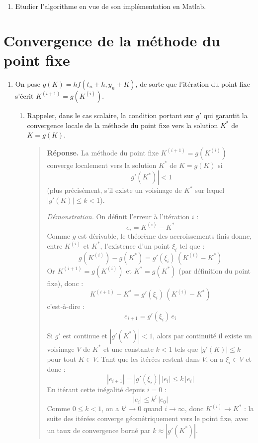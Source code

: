 \documentclass[a4paper, 12pt]{article}
\begin{document}
\begin{enumerate}[resume]

   \item Etudier l'algorithme en vue de son implémentation en Matlab.
   \end{enumerate}
   
   \section{Convergence de la méthode du point fixe}
   
\begin{enumerate}[resume]
   \item On pose $g(K) = h f(t_n+h, y_n+K)$, de sorte que l'itération du point fixe s'écrit $K^{(i+1)} = g(K^{(i)})$.

   \begin{enumerate}
       \item Rappeler, dans le cas scalaire, la condition portant sur $g'$ qui garantit la convergence locale de la méthode du point fixe vers la solution $K^*$ de $K = g(K)$.

       \begin{quote}
       \textbf{Réponse.} La méthode du point fixe $K^{(i+1)} = g(K^{(i)})$ converge localement vers la solution $K^*$ de $K = g(K)$ si
       \[
       |g'(K^*)| < 1
       \]
       (plus précisément, s'il existe un voisinage de $K^*$ sur lequel $|g'(K)| \le k < 1$).

       \textit{Démonstration.} On définit l'erreur à l'itération $i$ :
       \[
       e_i = K^{(i)} - K^*
       \]
       Comme $g$ est dérivable, le théorème des accroissements finis donne, entre $K^{(i)}$ et $K^*$, l'existence d'un point $\xi_i$ tel que :
       \[
       g(K^{(i)}) - g(K^*) = g'(\xi_i)\,(K^{(i)} - K^*)
       \]
       Or $K^{(i+1)} = g(K^{(i)})$ et $K^* = g(K^*)$ (par définition du point fixe), donc :
       \[
       K^{(i+1)} - K^* = g'(\xi_i)\,(K^{(i)} - K^*)
       \]
       c'est-à-dire :
       \[
       e_{i+1} = g'(\xi_i)\, e_i
       \]

       Si $g'$ est continue et $|g'(K^*)| < 1$, alors par continuité il existe un voisinage $V$ de $K^*$ et une constante $k<1$ tels que $|g'(K)| \le k$ pour tout $K \in V$. Tant que les itérées restent dans $V$, on a $\xi_i \in V$ et donc :
       \[
       |e_{i+1}| = |g'(\xi_i)|\,|e_i| \le k\,|e_i|
       \]
       En itérant cette inégalité depuis $i=0$ :
       \[
       |e_i| \le k^i \, |e_0|
       \]
       Comme $0 \le k < 1$, on a $k^i \to 0$ quand $i \to \infty$, donc $K^{(i)} \to K^*$ : la suite des itérées converge géométriquement vers le point fixe, avec un taux de convergence borné par $k \approx |g'(K^*)|$.


\end{quote}
\end{enumerate}
\end{enumerate}
\end{document}
